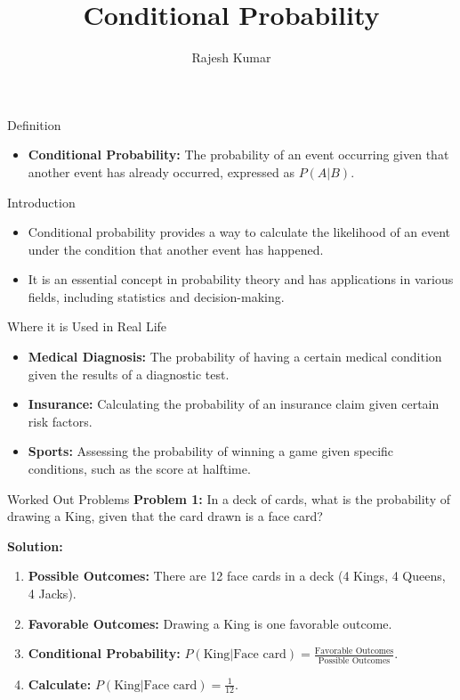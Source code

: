 
\title{Conditional Probability}
\author{Rajesh Kumar}
\date{}

\begin{frame}
  \titlepage
\end{frame}

\begin{frame}{Definition}
  \begin{itemize}
    \item \textbf{Conditional Probability:} The probability of an event occurring given that another event has already occurred, expressed as \( P(A|B) \).
  \end{itemize}
\end{frame}

\begin{frame}{Introduction}
  \begin{itemize}
    \item Conditional probability provides a way to calculate the likelihood of an event under the condition that another event has happened.
    \item It is an essential concept in probability theory and has applications in various fields, including statistics and decision-making.
  \end{itemize}
\end{frame}

\begin{frame}{Where it is Used in Real Life}
  \begin{itemize}
    \item \textbf{Medical Diagnosis:} The probability of having a certain medical condition given the results of a diagnostic test.
    \item \textbf{Insurance:} Calculating the probability of an insurance claim given certain risk factors.
    \item \textbf{Sports:} Assessing the probability of winning a game given specific conditions, such as the score at halftime.
  \end{itemize}
\end{frame}

\begin{frame}{Worked Out Problems}
  \textbf{Problem 1:} In a deck of cards, what is the probability of drawing a King, given that the card drawn is a face card?

  \textbf{Solution:}
  \begin{enumerate}
    \item \textbf{Possible Outcomes:} There are 12 face cards in a deck (4 Kings, 4 Queens, 4 Jacks).
    \item \textbf{Favorable Outcomes:} Drawing a King is one favorable outcome.
    \item \textbf{Conditional Probability:} \( P(\text{King}|\text{Face card}) = \frac{\text{Favorable Outcomes}}{\text{Possible Outcomes}} \).
    \item \textbf{Calculate:} \( P(\text{King}|\text{Face card}) = \frac{1}{12} \).
  \end{enumerate}
\end{frame}

